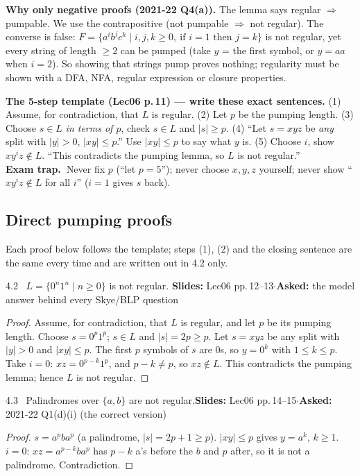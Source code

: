 \documentclass[10.5pt,a4paper]{article}
\newcommand{\TRAP}{\textbf{\color{trapborder}Exam trap.\ }}
\newcommand{\src}[2]{{\footnotesize\color{gray!70!black}\textbf{Slides:} #1\enspace$\cdot$\enspace\textbf{Asked:} #2}\par}
\begin{document}
\textbf{Why only negative proofs (2021-22 Q4(a)).} The lemma says regular $\Rightarrow$ pumpable. We use the contrapositive (not pumpable
$\Rightarrow$ not regular). The converse is false: $F=\{a^ib^jc^k\mid i,j,k\ge0,\ \text{if } i=1 \text{ then } j=k\}$ is not regular, yet
every string of length $\ge2$ can be pumped (take $y$ = the first symbol, or $y=aa$ when $i=2$). So showing that strings pump proves nothing;
regularity must be shown with a DFA, NFA, regular expression or closure properties.

\begin{trap}\textbf{The 5-step template (Lec06 p.\,11) --- write these exact sentences.}
(1) Assume, for contradiction, that $L$ is regular. (2) Let $p$ be the pumping length. (3) Choose $s\in L$ \emph{in terms of $p$}, check
$s\in L$ and $|s|\ge p$. (4) ``Let $s=xyz$ be \emph{any} split with $|y|>0$, $|xy|\le p$.'' Use $|xy|\le p$ to say what $y$ is.
(5) Choose $i$, show $xy^iz\notin L$. ``This contradicts the pumping lemma, so $L$ is not regular.''\\
\TRAP Never fix $p$ (``let $p=5$''); never choose $x,y,z$ yourself; never show ``$xy^iz\notin L$ for all $i$'' ($i=1$ gives $s$ back).
\end{trap}

\subsection{Direct pumping proofs}
Each proof below follows the template; steps (1), (2) and the closing sentence are the same every time and are written out in 4.2 only.

\begin{thm}{4.2 \ $L=\{0^n1^n\mid n\ge0\}$ is not regular.}
\src{Lec06 pp.\,12--13}{the model answer behind every Skye/BLP question}
\end{thm}
\begin{proof}
Assume, for contradiction, that $L$ is regular, and let $p$ be its pumping length. Choose $s=0^p1^p$; $s\in L$ and $|s|=2p\ge p$. Let $s=xyz$
be any split with $|y|>0$ and $|xy|\le p$. The first $p$ symbols of $s$ are 0s, so $y=0^k$ with $1\le k\le p$. Take $i=0$:
$xz=0^{p-k}1^p$, and $p-k\ne p$, so $xz\notin L$. This contradicts the pumping lemma; hence $L$ is not regular.
\end{proof}

\begin{thm}{4.3 \ Palindromes over $\{a,b\}$ are not regular.}\src{Lec06 pp.\,14--15}{2021-22 Q1(d)(i) (the correct version)}\end{thm}
\begin{proof}
$s=a^pba^p$ (a palindrome, $|s|=2p+1\ge p$). $|xy|\le p$ gives $y=a^k$, $k\ge1$. $i=0$: $xz=a^{p-k}ba^p$ has $p-k$ a's before the $b$ and $p$
after, so it is not a palindrome. Contradiction.
\end{proof}
\end{document}
